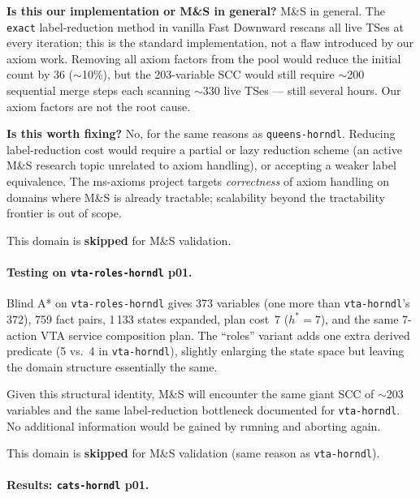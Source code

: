 \documentclass[11pt,a4paper]{article}
\begin{document}
    \textbf{Is this our implementation or M\&S in general?}  M\&S in
    general.  The \texttt{exact} label-reduction method in vanilla Fast
    Downward rescans all live TSes at every iteration; this is the
    standard implementation, not a flaw introduced by our axiom work.
    Removing all axiom factors from the pool would reduce the initial
    count by 36 ($\sim$10\%), but the 203-variable SCC would still
    require $\sim$200 sequential merge steps each scanning $\sim$330
    live TSes — still several hours.  Our axiom factors are not the
    root cause.

    \textbf{Is this worth fixing?}  No, for the same reasons as
    \texttt{queens-horndl}.  Reducing label-reduction cost would require
    a partial or lazy reduction scheme (an active M\&S research topic
    unrelated to axiom handling), or accepting a weaker label equivalence.
    The ms-axioms project targets \emph{correctness} of axiom handling on
    domains where M\&S is already tractable; scalability beyond the
    tractability frontier is out of scope.

    This domain is \textbf{skipped} for M\&S validation.

    \paragraph{Testing on \texttt{vta-roles-horndl} p01.}

    Blind A* on \texttt{vta-roles-horndl} gives 373 variables (one more
    than \texttt{vta-horndl}'s 372), 759 fact pairs, 1\,133 states
    expanded, plan cost~7 ($h^*=7$), and the same 7-action VTA service
    composition plan.  The ``roles'' variant adds one extra derived
    predicate (5 vs.\ 4 in \texttt{vta-horndl}), slightly enlarging
    the state space but leaving the domain structure essentially the same.

    Given this structural identity, M\&S will encounter the same giant
    SCC of $\sim$203 variables and the same label-reduction bottleneck
    documented for \texttt{vta-horndl}.  No additional information would
    be gained by running and aborting again.

    This domain is \textbf{skipped} for M\&S validation (same reason
    as \texttt{vta-horndl}).

    \paragraph{Results: \texttt{cats-horndl} p01.}
\end{document}
